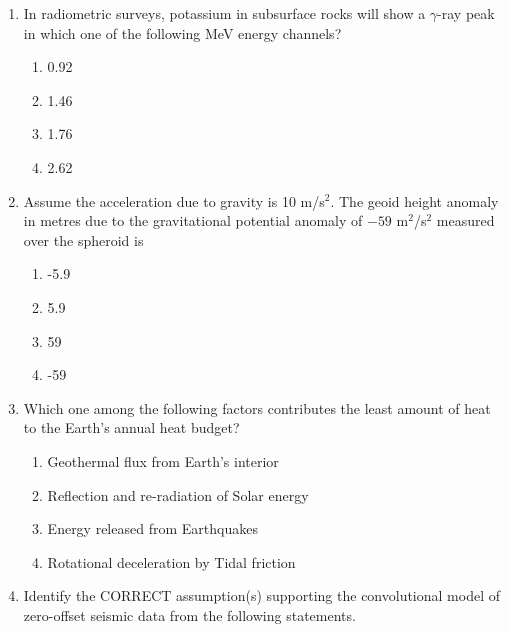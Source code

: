 \documentclass[journal,12pt,onecolumn]{IEEEtran}
\begin{document}
\begin{enumerate}
\item In radiometric surveys, potassium in subsurface rocks will show a $\gamma$-ray peak in which one of the following MeV energy channels?  

\hfill{}

\begin{multicols}{2}
\begin{enumerate}
\item 0.92
\item 1.46
\item 1.76
\item 2.62
\end{enumerate}
\end{multicols}

\item Assume the acceleration due to gravity is 10 m/s$^2$. The geoid height anomaly in metres due to the gravitational potential anomaly of $-59$ m$^2$/s$^2$ measured over the spheroid is  

\hfill{}

\begin{multicols}{2}
\begin{enumerate}
\item -5.9
\item 5.9
\item 59
\item -59
\end{enumerate}
\end{multicols}

\item Which one among the following factors contributes the least amount of heat to the Earth’s annual heat budget?  

\hfill{}

\begin{multicols}{2}
\begin{enumerate}
\item Geothermal flux from Earth’s interior
\item Reflection and re-radiation of Solar energy
\item Energy released from Earthquakes
\item Rotational deceleration by Tidal friction
\end{enumerate}
\end{multicols}

\item Identify the CORRECT assumption(s) supporting the convolutional model of zero-offset seismic data from the following statements.  


\end{enumerate}
\end{document}
